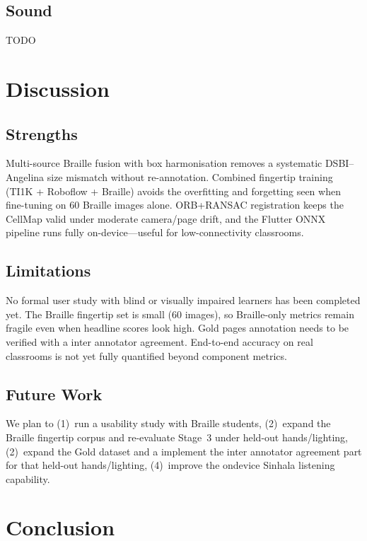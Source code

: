 \documentclass{article}
\begin{document}
\subsection{Sound}
TODO


\section{Discussion}

\subsection{Strengths}
Multi-source Braille fusion with box harmonisation removes a systematic
DSBI--Angelina size mismatch without re-annotation.  Combined fingertip
training (TI1K + Roboflow + Braille) avoids the overfitting and forgetting
seen when fine-tuning on 60 Braille images alone.  ORB+RANSAC registration
keeps the CellMap valid under moderate camera/page drift, and the Flutter
ONNX pipeline runs fully on-device---useful for low-connectivity classrooms.

\subsection{Limitations}
No formal user study with blind or visually impaired learners has been
completed yet. The Braille fingertip set is small (60 images), so
Braille-only metrics remain fragile even when headline scores look high.
Gold pages annotation needs to be verified with a inter annotator agreement.  End-to-end accuracy on real classrooms is not
yet fully quantified beyond component metrics.


\subsection{Future Work}
We plan to (1)~run a usability study with Braille students,
(2)~expand the Braille fingertip corpus and re-evaluate Stage~3 under
held-out hands/lighting,(2)~expand the Gold dataset and a implement the inter annotator agreement part for that
held-out hands/lighting, (4)~improve the ondevice Sinhala listening capability.


\section{Conclusion}
\end{document}
